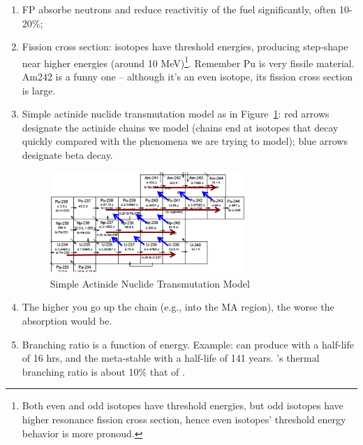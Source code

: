 \documentclass{school-22.211-notes}
\begin{document}
\begin{enumerate}
\item FP absorbe neutrons and reduce reactivitiy of the fuel
  significantly, often 10-20\%;

\item Fission cross section: isotopes have threshold energies,
  producing step-shape near higher energies (around 10
  MeV)\footnote{Both even and odd isotopes have threshold energies,
    but odd isotopes have higher resonance fission cross section,
    hence even isotopes' threshold energy behavior is more
    pronoud.}. Remember Pu is very fissile material. Am242 is a funny
  one -- although it's an even isotope, its fission cross section is
  large.

\item Simple actinide nuclide transmutation model as in
  Figure~\ref{actinide-model}: red arrows designate the actinide
  chains we model (chains end at isotopes that decay quickly compared
  with the phenomena we are trying to model); blue arrows designate
  beta decay.
\begin{figure}[h]
  \centering
  \includegraphics[width=0.7\textwidth]{images/dfs/actinide-model.png}
  \caption{Simple Actinide Nuclide Transmutation Model} \label{actinide-model}
\end{figure}

\item The higher you go up the chain (e.g., into the MA region), the
  worse the absorption would be.

\item Branching ratio is a function of energy. Example: 
  can produce  with a half-life of 16 hrs, and the
  meta-stable  with a half-life of 141
  years. 's thermal branching ratio is about 10\% that of
  .
\end{enumerate}
\end{document}
